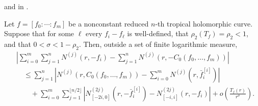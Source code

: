 \begin{leanproof}
 and
 in
.
\end{leanproof}

\begin{theorem}
\leanok
{}
Let $f=[f_0:\cdots:f_m]$ be a nonconstant reduced $n$-th tropical
holomorphic curve.  Suppose that for some $\ell$ every $f_i-f_\ell$ is
well-defined, that $\rho_2(T_f)=\rho_2<1$, and that
$0<\sigma<1-\rho_2$.  Then, outside a set of finite logarithmic measure,
\begin{align*}
&\left|\sum_{i=0}^m\sum_{j=1}^nN^{(j)}(r,-f_i)
-\sum_{j=1}^nN^{(j)}\!\left(r,-C_0(f_0,\ldots,f_m)\right)\right|\\
&\quad\leq
\sum_{j=1}^n\left|N^{(j)}\!\left(r,C_0(f_0,\ldots,f_m)\right)
-\sum_{i=0}^mN^{(j)}(r,\bar f_i^{[i]})\right|\\
&\qquad+
\sum_{i=0}^m\sum_{j=1}^{\lfloor n/2\rfloor}
\left|N_{[-2i,0]}^{(2j)}(r,-\bar f_i^{[i]})
-N_{[-i,i]}^{(2j)}(r,-f_i)\right|
+o\!\left(\frac{T_f(r)}{r^\sigma}\right).
\end{align*}
\end{theorem}

